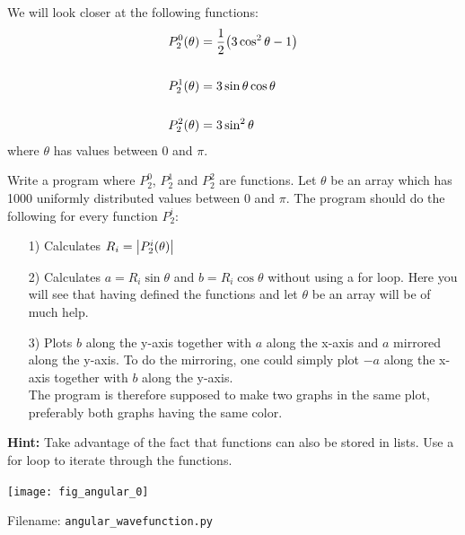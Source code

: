 \documentclass[10pt,a4paper]{article}
\begin{document}
We will look closer at the following functions:
\begin{align*}
	P_2^0(\theta) &= \frac{1}{2}\qty(3\cos^2\theta - 1) \\
	\hfill \\
	P_2^1(\theta) &= 3\sin\theta\cos\theta \\
	\hfill \\
	P_2^2(\theta) &= 3\sin^2\theta
\end{align*}
where $\theta$ has values between 0 and $\pi$.

Write a program where $P_2^0$, $P_2^1$ and  $P_2^2$ are functions. Let $\theta$ be an array which has 1000 uniformly distributed values between 0 and $\pi$. The program should do the following for every function $P_2^i$:
\begin{itemize}
	\item[1)] Calculates $R_i = \abs{P_2^i(\theta)}$
	\item[2)] Calculates $a = R_i\sin\theta$ and $b = R_i\cos\theta$ without using a for loop. Here you will see that having defined the functions and let $\theta$ be an array will be of much help. 
	\item[3)] Plots $b$ along the y-axis together with $a$ along the x-axis and $a$ mirrored along the y-axis. To do the mirroring, one could simply plot $-a$ along the x-axis together with $b$ along the y-axis. \\The program is therefore supposed to make two graphs in the same plot, preferably both graphs having the same color. 
\end{itemize} 

\textbf{Hint:} Take advantage of the fact that functions can also be stored in lists. Use a for loop to iterate through the functions. 

\begin{center}
	\texttt{[image: fig\_angular\_0]}
\end{center}

Filename: \texttt{angular\_wavefunction.py}
\end{document}
